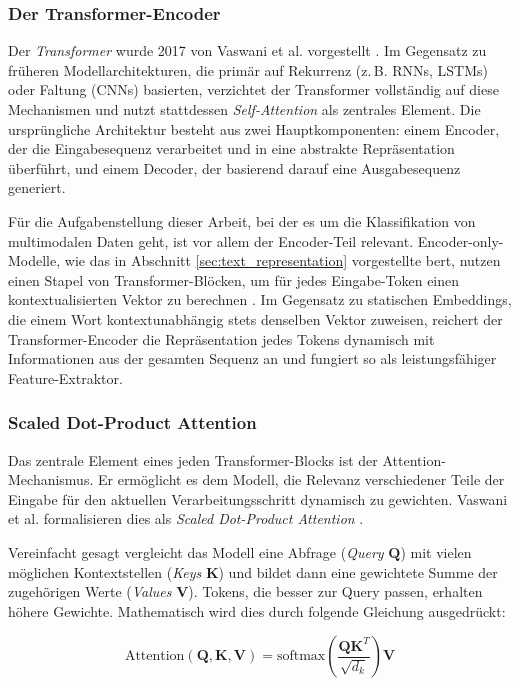\subsubsection{Der Transformer-Encoder}

Der \textit{Transformer} wurde 2017 von Vaswani et al. vorgestellt \cite{Vaswani2017}. Im Gegensatz zu früheren Modellarchitekturen, die primär auf Rekurrenz (z.\,B. RNNs, LSTMs) oder Faltung (CNNs) basierten, verzichtet der Transformer vollständig auf diese Mechanismen und nutzt stattdessen \textit{Self-Attention} als zentrales Element. Die ursprüngliche Architektur besteht aus zwei Hauptkomponenten: einem Encoder, der die Eingabesequenz verarbeitet und in eine abstrakte Repräsentation überführt, und einem Decoder, der basierend darauf eine Ausgabesequenz generiert.

Für die Aufgabenstellung dieser Arbeit, bei der es um die Klassifikation von multimodalen Daten geht, ist vor allem der Encoder-Teil relevant. Encoder-only-Modelle, wie das in Abschnitt \ref{sec:text_representation} vorgestellte \gls{bert}, nutzen einen Stapel von Transformer-Blöcken, um für jedes Eingabe-Token einen kontextualisierten Vektor zu berechnen \cite{Devlin2019}. 
Im Gegensatz zu statischen Embeddings, die einem Wort kontextunabhängig stets denselben Vektor zuweisen, reichert der Transformer-Encoder die Repräsentation jedes Tokens dynamisch mit Informationen aus der gesamten Sequenz an und fungiert so als leistungsfähiger Feature-Extraktor.

\subsubsection{Scaled Dot-Product Attention}

Das zentrale Element eines jeden Transformer-Blocks ist der Attention-Mechanismus. Er ermöglicht es dem Modell, die Relevanz verschiedener Teile der Eingabe für den aktuellen Verarbeitungsschritt dynamisch zu gewichten. Vaswani et al. formalisieren dies als \textit{Scaled Dot-Product Attention} \cite{Vaswani2017}.

Vereinfacht gesagt vergleicht das Modell eine Abfrage (\textit{Query} $\mathbf{Q}$) mit vielen möglichen Kontextstellen (\textit{Keys} $\mathbf{K}$) und bildet dann eine gewichtete Summe der zugehörigen Werte (\textit{Values} $\mathbf{V}$). Tokens, die besser zur Query passen, erhalten höhere Gewichte. Mathematisch wird dies durch folgende Gleichung ausgedrückt:

\begin{equation}
    \text{Attention}(\mathbf{Q}, \mathbf{K}, \mathbf{V}) = \text{softmax}\left(\frac{\mathbf{Q}\mathbf{K}^T}{\sqrt{d_k}}\right)\mathbf{V}
\end{equation}

